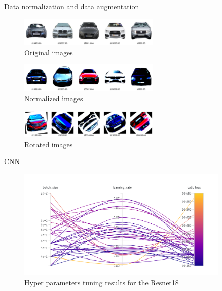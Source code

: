 \documentclass{beamer}
\begin{document}
    \begin{frame}{Data normalization and data augmentation} 
        

    \centering

    \begin{figure}[ht]
    \centering
    \label{table:images without transformations}
    \includegraphics[width=0.6\textwidth]{images without transformations.png}
    \caption{Original images}
    \end{figure}

    \begin{figure}[ht]
    \centering
    \includegraphics[width=0.6\textwidth]{testing images.png}
    \caption{Normalized images}
    \label{Normalized images}
    \end{figure}

    \begin{figure}[ht]
    \centering
    \includegraphics[width=0.6\textwidth]{training images.png}
    \caption{Rotated images}
    \label{training images}
    \end{figure}
    
    \end{frame}
    \begin{frame}{CNN} 

    \begin{figure}[ht]
        \centering
        \includegraphics[width=0.9\textwidth]{cnn_wandb.png}
        \caption{Hyper parameters tuning results for the Resnet18}
        \label{Tuning CNN}
    \end{figure}
    \end{frame}
    
\end{document}
